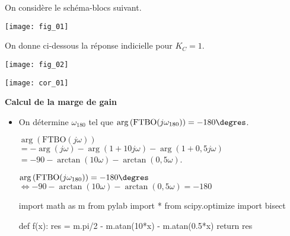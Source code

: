 




\ifprof
\else
\begin{multicols}{2}
\fi

\setcounter{numques}{0}
On considère le schéma-blocs suivant. 
\begin{center}
\texttt{[image: fig\_01]}
\end{center}

On donne ci-dessous la réponse indicielle pour $K_C=1$.

\begin{center}
\texttt{[image: fig\_02]}
\end{center}



\ifprof
\begin{center}
\texttt{[image: cor\_01]}
\end{center}

\else
\fi


\ifprof
\begin{corrige}
\textbf{Calcul de la marge de gain}
\begin{itemize}
\item On détermine $\omega_{180}$ tel que $\arg\left(\text{FTBO}(j\omega_{180})\right)=-180\degres$. 

$\arg\left(\text{FTBO}(j\omega)\right) $ $= -\arg\left( j\omega\right)-\arg\left( 1+ 10 j\omega\right)-\arg\left(1+0,5j\omega \right) $ $= - 90 - \arctan \left( 10 \omega \right) - \arctan \left( 0,5 \omega \right)$.

$\arg\left(\text{FTBO}(j\omega_{180})\right)=-180\degres$ 
$\Leftrightarrow - 90 - \arctan \left( 10 \omega \right) - \arctan \left( 0,5 \omega \right) = -180$

\begin{python}
import math as m
from pylab import *
from scipy.optimize import bisect 

def f(x):                                       
    res = m.pi/2 - m.atan(10*x) - m.atan(0.5*x)
    return res


\end{python}
\end{itemize}
\end{corrige}
\end{multicols}
